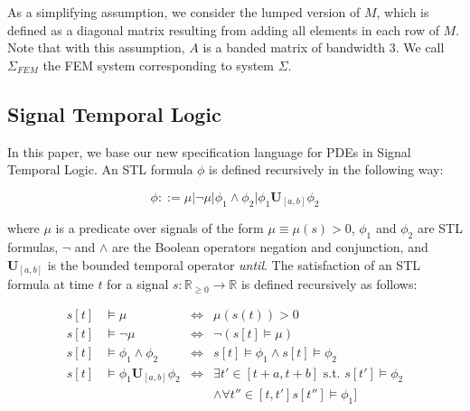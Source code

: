 \documentclass[oribibl]{llncs/llncs}
\newcommand*{\R}{\mathbb{R}}
\newcommand{\luntil}{\mathbf{U}}
\begin{document}
As a simplifying assumption, we consider the lumped version of $M$, which is
defined as a diagonal matrix resulting from adding all elements in each row of
$M$. Note that with this assumption, $A$ is a banded matrix of bandwidth 3. 
We call $\Sigma_{FEM}$ the FEM system corresponding to system $\Sigma$.


\subsection{Signal Temporal Logic}
\label{sec:signal_temporal_logic}


In this paper, we base our new specification language for PDEs in Signal
Temporal Logic. An STL formula $\phi$ is defined recursively in the following way:

\begin{equation}
    \phi ::= \mu | \lnot \mu | \phi_1 \land \phi_2 | \phi_1 \luntil_{[a,b]} \phi_2
\end{equation}

where $\mu$ is a predicate over signals of the form $\mu \equiv \mu(s) > 0$,
$\phi_1$ and $\phi_2$ are STL formulas,
$\lnot$ and $\land$ are the Boolean operators negation and conjunction, and
$\luntil_{[a, b]}$ is the bounded temporal operator \emph{until}. The satisfaction
of an STL formula at time $t$ for a signal $s :
\R_{\geq 0} \to \R$ is defined recursively as follows:

\begin{equation}
    \begin{aligned}
        s[t] &\models \mu &\iff &\mu(s(t)) > 0 \\
        s[t] &\models \lnot \mu &\iff &\lnot (s[t] \models \mu) \\
        s[t] &\models \phi_1 \land \phi_2 &\iff &s[t] \models \phi_1 \land s[t]
        \models \phi_2 \\
        s[t] &\models \phi_1 \luntil_{[a,b]} \phi_2 &\iff 
            &\exists t' \in [t+a, t+b] \text{ s.t. } s[t'] \models \phi_2 \\
        & & &\land \forall t'' \in [t, t'] s[t''] \models \phi_1]
    \end{aligned}
\end{equation}
\end{document}

